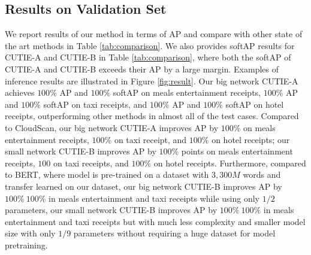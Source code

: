 \documentclass[10pt,twocolumn,letterpaper]{article}
\begin{document}
\subsection{Results on Validation Set}
We report results of our method in terms of AP and compare with other state of the art methods in Table \ref{tab:comparison}. We also provides softAP results for CUTIE-A and CUTIE-B in Table \ref{tab:comparison}, where both the softAP of CUTIE-A and CUTIE-B exceeds their AP by a large margin.  Examples of inference results are illustrated in Figure \ref{fig:result}. Our big network CUTIE-A achieves $100\%$ AP and $100\%$ softAP on meals entertainment receipts, $100\%$ AP and $100\%$ softAP on taxi receipts, and $100\%$ AP and $100\%$ softAP on hotel receipts, outperforming other methods in almost all of the test cases. Compared to CloudScan, our big network CUTIE-A improves AP by $100\%$ on meals entertainment receipts, $100\%$ on taxi receipt, and $100\%$ on hotel receipts; our small network CUTIE-B improves AP by $100\%$ points on meals entertainment receipts, $100$ on taxi receipts, and $100\%$ on hotel receipts. Furthermore, compared to BERT, where model is pre-trained on a dataset with $3,300M$ words and transfer learned on our dataset, our big network CUTIE-B improves AP by $100\%~100\%$ in meals entertainment and taxi receipts while using only $1/2$ parameters, our small network CUTIE-B improves AP by $100\%~100\%$ in meals entertainment and taxi receipts but with much less complexity and smaller model size with only $1/9$ parameters without requiring a huge dataset for model pretraining. 
\end{document}
